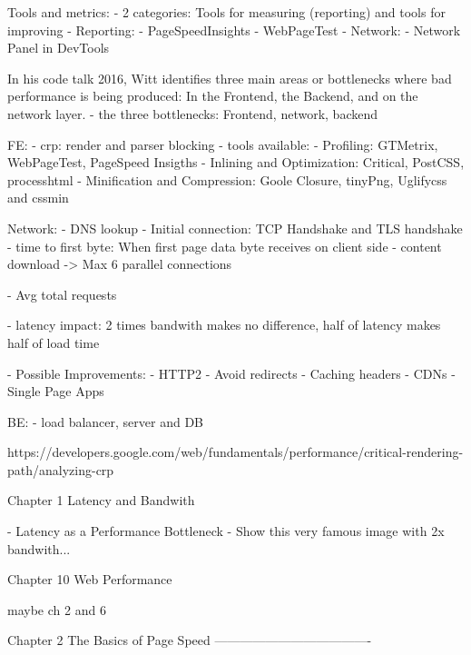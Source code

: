 Tools and metrics:
- 2 categories: Tools for measuring (reporting) and tools for improving
- Reporting:
- PageSpeedInsights
- WebPageTest
- Network:
- Network Panel in DevTools








In his code talk 2016, Witt identifies three main areas or bottlenecks where bad performance is being produced: In the Frontend, the Backend, and on the network layer. 
- the three bottlenecks: Frontend, network, backend

FE:
- crp: render and parser blocking
- tools available:
- Profiling: GTMetrix, WebPageTest, PageSpeed Insigths
- Inlining and Optimization: Critical, PostCSS, processhtml
- Minification and Compression: Goole Closure, tinyPng, Uglifycss and cssmin


Network:
- DNS lookup
- Initial connection: TCP Handshake and TLS handshake
- time to first byte: When first page data byte receives on client side
- content download
-> Max 6 parallel connections

- Avg total requests %

- latency impact: 2 times bandwith makes no difference, half of latency makes half of load time

- Possible Improvements:
- HTTP2
- Avoid redirects
- Caching headers
- CDNs
- Single Page Apps


BE:
- load balancer, server and DB



https://developers.google.com/web/fundamentals/performance/critical-rendering-path/analyzing-crp






Chapter 1 Latency and Bandwith

- Latency as a Performance Bottleneck
- Show this very famous image with 2x bandwith... 

Chapter 10 Web Performance





maybe ch 2 and 6

Chapter 2 The Basics of Page Speed
-------------------------------------

